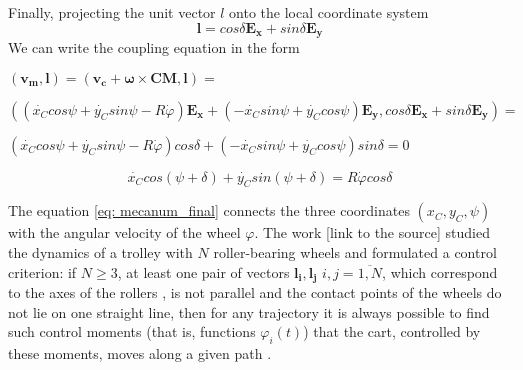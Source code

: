 \documentclass[oneside,final,14pt]{extreport}
\newcommand{\bs}{\boldsymbol}
\begin{document}
\begin{figure} [H]
\end{figure}

 Finally, projecting the unit vector $ l $ onto the local coordinate system
\begin{equation}
\bs{l}
=
cos \delta
\bs{E_{x}}
+
sin \delta
\bs{E_{y}}
\end{equation}
We can write the coupling equation in the form
\begin{flushleft}
$
(
\bs{v_{m}}
,
\bs{l}
)
=
(
\bs{v_{c}}
+
\bs{\omega}
\times
\bs{CM}
,
\bs{l}
)
=
$

$
(
(
\dot{x_{C}}
cos \psi
+
\dot{y_{C}}
sin \psi
-R \dot{\varphi}
)
\bs{E_{x}}
+
(
- \dot{x_{C}}
sin \psi
+
\dot{y_{C}}
cos \psi
)
\bs{E_{y}}
,
cos \delta
\bs{E_{x}}
+
sin \delta
\bs{E_{y}}
)
=
$

$
(
\dot{x_{C}}
cos \psi
+
\dot{y_{C}}
sin \psi
-R \dot{\varphi}
)
cos \delta
+
(
- \dot{x_{C}}
sin \psi
+
\dot{y_{C}}
cos \psi
)
sin \delta
=
0
$
\end{flushleft}
\begin{equation}
\label{eq: mecanum_final}
\dot{x_{C}}
cos (\psi + \delta)
+
\dot{y_{C}}
sin (\psi + \delta)
=
R \dot{\varphi}
cos \delta
\end{equation}

The equation \ref{eq: mecanum_final} connects the three coordinates $ (x_{C}, y_{C}, \psi) $ with the angular velocity of the wheel $ \varphi $. The work [link to the source] studied the dynamics of a trolley with $ N $ roller-bearing wheels and formulated a control criterion:
if $ N \geq 3 $, at least one pair of vectors $ \bs{l_{i}}, \bs{l_{j}} $ $ i, j = \overline{1, N} $, which correspond to the axes of the rollers , is not parallel and the contact points of the wheels do not lie on one straight line, then for any trajectory it is always possible to find such control moments (that is, functions $ \varphi_{i} (t) $) that the cart, controlled by these moments, moves along a given path .
\end{document}
